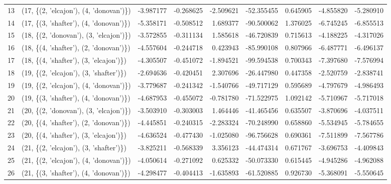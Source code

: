 \begin{tabular}{llrrrrrrr}
13 &  (17, \{(2, 'elcajon'), (4, 'donovan')\}) &  -3.987177 &  -0.268625 &  -2.509621 &   -52.355455 &   0.645905 &  -4.855820 &  -5.280910 \\
14 &  (17, \{(3, 'shafter'), (4, 'donovan')\}) &  -5.358171 &  -0.508512 &   1.689377 &   -90.500062 &   1.376025 &  -6.745245 &  -6.855513 \\
15 &  (18, \{(2, 'donovan'), (3, 'elcajon')\}) &  -3.572855 &  -0.311134 &   1.585618 &   -46.720839 &   0.715613 &  -4.188225 &  -4.317026 \\
16 &  (18, \{(4, 'shafter'), (2, 'donovan')\}) &  -4.557604 &  -0.244718 &   0.423943 &   -85.990108 &   0.807966 &  -6.487771 &  -6.496137 \\
17 &  (18, \{(4, 'shafter'), (3, 'elcajon')\}) &  -4.305507 &  -0.451072 &  -1.894521 &   -99.594538 &   0.700343 &  -7.397680 &  -7.576994 \\
18 &  (19, \{(2, 'elcajon'), (3, 'shafter')\}) &  -2.694636 &  -0.420451 &   2.307696 &   -26.447980 &   0.447358 &  -2.520759 &  -2.838741 \\
19 &  (19, \{(2, 'elcajon'), (4, 'donovan')\}) &  -3.779687 &  -0.241342 &  -1.540766 &   -49.717129 &   0.595689 &  -4.797679 &  -4.986493 \\
20 &  (19, \{(3, 'shafter'), (4, 'donovan')\}) &  -4.687953 &  -0.455072 &  -0.781780 &   -71.522975 &   1.092142 &  -5.710967 &  -5.717018 \\
21 &  (20, \{(2, 'donovan'), (3, 'elcajon')\}) &  -3.503910 &  -0.303003 &   1.464446 &   -41.465456 &   0.635507 &  -3.870696 &  -4.037511 \\
22 &  (20, \{(4, 'shafter'), (2, 'donovan')\}) &  -4.445851 &  -0.240315 &  -2.283324 &   -70.248990 &   0.658860 &  -5.534945 &  -5.784655 \\
23 &  (20, \{(4, 'shafter'), (3, 'elcajon')\}) &  -4.636524 &  -0.477430 &  -1.025080 &   -96.756628 &   0.690361 &  -7.511899 &  -7.567786 \\
24 &  (21, \{(2, 'elcajon'), (3, 'shafter')\}) &  -3.825211 &  -0.568339 &   3.356123 &   -44.474314 &   0.671767 &  -3.696753 &  -4.409843 \\
25 &  (21, \{(2, 'elcajon'), (4, 'donovan')\}) &  -4.050614 &  -0.271092 &   0.625332 &   -50.073330 &   0.615445 &  -4.945286 &  -4.962088 \\
26 &  (21, \{(3, 'shafter'), (4, 'donovan')\}) &  -4.298477 &  -0.404413 &  -1.635893 &   -61.520885 &   0.926730 &  -5.368091 &  -5.550645 \\
\bottomrule
\end{tabular}
